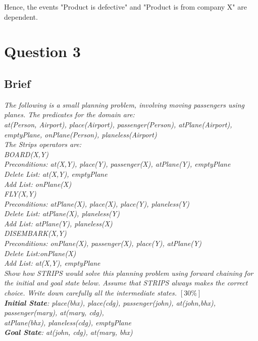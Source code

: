 \documentclass{article}
\begin{document}
Hence, the events "Product is defective" and "Product is from company X" are dependent.
 
\newpage
\section{Question 3}
\subsection{Brief}
\textit{
The following is a small planning problem, involving moving passengers using planes. The
predicates for the domain are: \\
\newline
at(Person, Airport), place(Airport), passenger(Person),
atPlane(Airport), emptyPlane, onPlane(Person), planeless(Airport)\\
\newline
The Strips operators are:\\
\newline
BOARD(X,Y) \\
\-\hspace{10mm} Preconditions: at(X,Y), place(Y), passenger(X), atPlane(Y), emptyPlane \\
\-\hspace{10mm} Delete List: at(X,Y), emptyPlane \\
\-\hspace{10mm} Add List: onPlane(X) \\
\newline
FLY(X,Y) \\
\-\hspace{10mm} Preconditions: atPlane(X), place(X), place(Y), planeless(Y) \\
\-\hspace{10mm} Delete List: atPlane(X), planeless(Y) \\
\-\hspace{10mm} Add List: atPlane(Y), planeless(X) \\
\newline
DISEMBARK(X,Y) \\
\-\hspace{10mm} Preconditions: onPlane(X), passenger(X), place(Y), atPlane(Y) \\
\-\hspace{10mm} Delete List:onPlane(X) \\
\-\hspace{10mm} Add List: at(X,Y), emptyPlane \\
\newline
Show how STRIPS would solve this planning problem using forward chaining for the
initial and goal state below. Assume that STRIPS always makes the correct choice.
Write down carefully all the intermediate states. $[30\%]$ \\
\newline
\textbf{Initial State}: place(bhx),
place(cdg), passenger(john), at(john,bhx), passenger(mary), at(mary, cdg), \\
atPlane(bhx), planeless(cdg), emptyPlane \\ \newline 
\textbf{Goal State}: at(john, cdg), at(mary, bhx)
}
\end{document}
